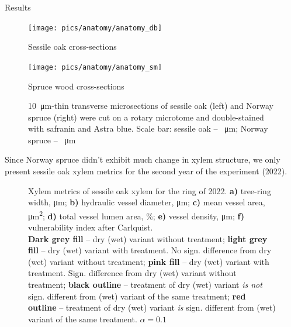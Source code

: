 \documentclass[final]{beamer}
\newlength{\colwidth}
\begin{document}
\begin{frame}[t]
\begin{columns}[t]
\begin{column}{\colwidth}
\begin{block}{Results}
    \begin{figure}
        \begin{minipage}{0.45\textwidth}
            \centering \texttt{[image: pics/anatomy/anatomy\_db]}
            \caption*{Sessile oak cross-sections}
            \label{fig:anatomy_db}
        \end{minipage}\hfill
        \begin{minipage}{0.45\textwidth}
            \centering \texttt{[image: pics/anatomy/anatomy\_sm]}
            \caption*{Spruce wood cross-sections}
            \label{fig:anatomy_sm}
        \end{minipage}\hfill
        \caption{\SI{10}{\micro\meter}-thin transverse microsections of sessile oak (left) and Norway spruce (right) were cut on a rotary microtome and double-stained with safranin and Astra blue. Scale bar: sessile oak -- \SI{}{\micro\meter}; Norway spruce -- \SI{}{\micro\meter}}
    \end{figure}
    Since Norway spruce didn't exhibit much change in xylem structure, we only present sessile oak xylem metrics for the second year of the experiment (2022).
    \begin{figure}
        
        \caption{
            Xylem metrics of sessile oak xylem for the ring of 2022.
            \textbf{a)} tree-ring width, \si{\micro\meter};
            \textbf{b)} hydraulic vessel diameter, \si{\micro\meter};
            \textbf{c)} mean vessel area, \si{\micro\meter\squared};
            \textbf{d)} total vessel lumen area, \%;
            \textbf{e)} vessel density, \si{\micro\meter};
            \textbf{f)} vulnerability index after Carlquist. \\
            \textbf{Dark grey fill} -- dry (wet) variant without treatment;
            \textbf{light grey fill} -- dry (wet) variant with treatment. No sign. difference from dry (wet) variant without treatment;
            \textbf{pink fill} -- dry (wet) variant with treatment. Sign. difference from dry (wet) variant without treatment;
            \textbf{black outline} -- treatment of dry (wet) variant \emph{is not} sign. different from (wet) variant of the same treatment;
            \textbf{red outline} -- treatment of dry (wet) variant \emph{is} sign. different from (wet) variant of the same treatment.
            $\alpha = 0.1$
        }
        \label{fig:oak_box}
    \end{figure}
\end{block}


\end{column}
\end{columns}
\end{frame}
\end{document}
